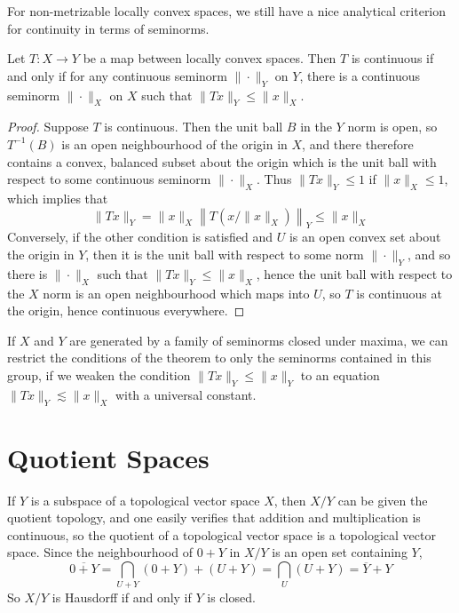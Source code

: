 For non-metrizable locally convex spaces, we still have a nice analytical criterion for continuity in terms of seminorms.

\begin{theorem}
    Let $T: X \to Y$ be a map between locally convex spaces. Then $T$ is continuous if and only if for any continuous seminorm $\| \cdot \|_Y$ on $Y$, there is a continuous seminorm $\| \cdot \|_X$ on $X$ such that $\| Tx \|_Y \leq \| x \|_X$.
\end{theorem}
\begin{proof}
    Suppose $T$ is continuous. Then the unit ball $B$ in the $Y$ norm is open, so $T^{-1}(B)$ is an open neighbourhood of the origin in $X$, and there therefore contains a convex, balanced subset about the origin which is the unit ball with respect to some continuous seminorm $\| \cdot \|_X$. Thus $\| Tx \|_Y \leq 1$ if $\| x \|_X \leq 1$, which implies that
    \[ \| Tx \|_Y = \| x \|_X \left\| T \left( x/\|x \|_X \right) \right\|_Y \leq \| x \|_X \]
    Conversely, if the other condition is satisfied and $U$ is an open convex set about the origin in $Y$, then it is the unit ball with respect to some norm $\| \cdot \|_Y$, and so there is $\| \cdot \|_X$ such that $\| Tx \|_Y \leq \| x \|_X$, hence the unit ball with respect to the $X$ norm is an open neighbourhood which maps into $U$, so $T$ is continuous at the origin, hence continuous everywhere.
\end{proof}

If $X$ and $Y$ are generated by a family of seminorms closed under maxima, we can restrict the conditions of the theorem to only the seminorms contained in this group, if we weaken the condition $\| Tx \|_Y \leq \| x \|_Y$ to an equation $\| Tx \|_Y \lesssim \| x \|_X$ with a universal constant.

\section{Quotient Spaces}

If $Y$ is a subspace of a topological vector space $X$, then $X/Y$ can be given the quotient topology, and one easily verifies that addition and multiplication is continuous, so the quotient of a topological vector space is a topological vector space. Since the neighbourhood of $0 + Y$ in $X/Y$ is an open set containing $Y$,
%
\[ \overline{0 + Y} = \bigcap_{U + Y} (0 + Y) + (U + Y) = \bigcap_{U} (U + Y) = \overline{Y} + Y \]
%
So $X/Y$ is Hausdorff if and only if $Y$ is closed.

